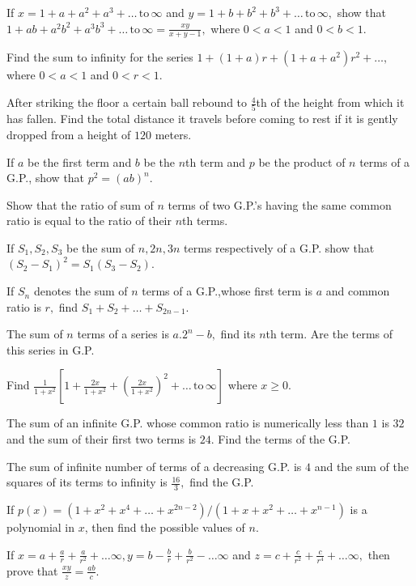 \item If $x = 1 + a + a^2 + a^3 + \ldots\,\text{to}\,\infty$ and $y = 1 + b + b^2 + b^3 + \ldots\,\text{to}\,\infty,$ show
  that $1 + ab + a^2b^2 + a^3b^3 + \ldots\,\text{to}\,\infty = \frac{xy}{x + y - 1},$ where $0<a< 1$ and $0<b<1$.
\item Find the sum to infinity for the series $1 + (1 + a)r + (1 + a + a^2)r^2 + \ldots,$ where $0<a<1$ and $0<r<1$.
\item After striking the floor a certain ball rebound to $\frac{4}{5}$th of the height from which it has fallen. Find the total
  distance it travels before coming to rest if it is gently dropped from a height of $120$ meters.
\item If $a$ be the first term and $b$ be the $n$th term and $p$ be the product of $n$ terms of a G.P., show that $p^2 = (ab)^n$.
\item Show that the ratio of sum of $n$ terms of two G.P.'s having the same common ratio is equal to the ratio of their $n$th
  terms.
\item If $S_1, S_2, S_3$ be the sum of $n, 2n, 3n$ terms respectively of a G.P. show that $(S_2 - S_1)^2 = S_1(S_3 - S_2)$.
\item If $S_n$ denotes the sum of $n$ terms of a G.P.,whose first term is $a$ and common ratio is $r,$ find $S_1 + S_2 +  \ldots +
  S_{2n - 1}$.
\item The sum of $n$ terms of a series is $a.2^n - b,$ find its $n$th term. Are the terms of this series in G.P.
\item Find $\frac{1}{1 + x^2}\left[1 + \frac{2x}{1 + x^2} + \left(\frac{2x}{1 + x^2}\right)^2 + \ldots\,\text{to}\,\infty\right]$
  where $x\geq 0$.
\item The sum of an infinite G.P. whose common ratio is numerically less than $1$ is $32$ and the sum of their first two
  terms is $24.$ Find the terms of the G.P.
\item The sum of infinite number of terms of a decreasing G.P. is $4$ and the sum of the squares of its terms to infinity
  is $\frac{16}{3},$ find the G.P.
\item If $p(x) = (1 + x^2 + x^4 + \ldots + x^{2n - 2})/(1 + x + x^2 + \ldots + x^{n - 1})$ is a polynomial in $x$, then
  find the possible values of $n$.
\item If $x = a + \frac{a}{r} + \frac{a}{r^2} + \ldots \infty, y = b - \frac{b}{r} + \frac{b}{r^2} - \ldots \infty$ and $z
  = c + \frac{c}{r^2} + \frac{c}{r^4} + \ldots \infty,$ then prove that $\frac{xy}{z} = \frac{ab}{c}$.

